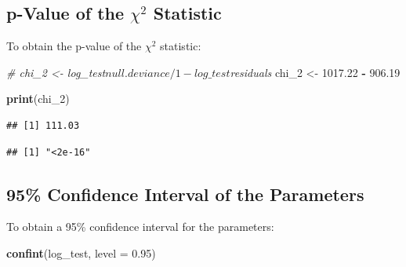 \documentclass[
]{article}
\newenvironment{Shaded}{\begin{snugshade}}{\end{snugshade}}
\newcommand{\AttributeTok}[1]{\textcolor[rgb]{0.13,0.29,0.53}{#1}}
\newcommand{\CommentTok}[1]{\textcolor[rgb]{0.56,0.35,0.01}{\textit{#1}}}
\newcommand{\DecValTok}[1]{\textcolor[rgb]{0.00,0.00,0.81}{#1}}
\newcommand{\FloatTok}[1]{\textcolor[rgb]{0.00,0.00,0.81}{#1}}
\newcommand{\FunctionTok}[1]{\textcolor[rgb]{0.13,0.29,0.53}{\textbf{#1}}}
\newcommand{\NormalTok}[1]{#1}
\newcommand{\OtherTok}[1]{\textcolor[rgb]{0.56,0.35,0.01}{#1}}
\newcommand{\SpecialCharTok}[1]{\textcolor[rgb]{0.81,0.36,0.00}{\textbf{#1}}}
\begin{document}
\subsection{\texorpdfstring{p-Value of the \(\chi^2\)
Statistic}{p-Value of the \textbackslash chi\^{}2 Statistic}}\label{p-value-of-the-chi2-statistic}

To obtain the p-value of the \(\chi^2\) statistic:

\begin{Shaded}
\begin{Highlighting}[]
\CommentTok{\# chi\_2 \textless{}{-} log\_test$null.deviance/1 {-} log\_test$residuals}
\NormalTok{chi\_2 }\OtherTok{\textless{}{-}} \FloatTok{1017.22} \SpecialCharTok{{-}} \FloatTok{906.19}

\FunctionTok{print}\NormalTok{(chi\_2)}
\end{Highlighting}
\end{Shaded}

\begin{verbatim}
## [1] 111.03
\end{verbatim}

\begin{Shaded}
\end{Shaded}

\begin{verbatim}
## [1] "<2e-16"
\end{verbatim}

\subsection{95\% Confidence Interval of the
Parameters}\label{confidence-interval-of-the-parameters}

To obtain a 95\% confidence interval for the parameters:

\begin{Shaded}
\begin{Highlighting}[]
\FunctionTok{confint}\NormalTok{(log\_test, }\AttributeTok{level =} \FloatTok{0.95}\NormalTok{)}
\end{Highlighting}
\end{Shaded}
\end{document}
